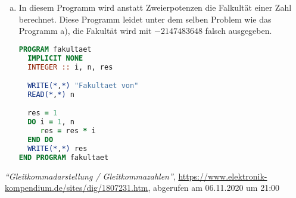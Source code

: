 \documentclass{article}
\begin{document}
\begin{enumerate}[a)]
\begin{lstlisting}[language=Fortran, showstringspaces=false]
  WRITE(*,*) "Anzahl Potenzen"
  READ(*,*) imax

  pot = 1
  DO i = 1, imax
     IF (i > 62) THEN
        WRITE(*,*) "Groessere Potenzen koennen &
             &mit dem Datentyp nicht mehr abgebildet werden"
        EXIT
     END IF
     pot = pot * 2
     WRITE(*,*) pot
  END DO
END PROGRAM Potenz_d
  \end{lstlisting}

\pagebreak
\item
  In diesem Programm wird anstatt Zweierpotenzen die Falkultät einer Zahl berechnet.
  Diese Programm leidet unter dem selben Problem wie das Programm a), die Fakultät wird
  mit $-2147483648$ falsch ausgegeben.
  \begin{lstlisting}[language=Fortran, showstringspaces=false]
PROGRAM fakultaet
  IMPLICIT NONE
  INTEGER :: i, n, res

  WRITE(*,*) "Fakultaet von"
  READ(*,*) n

  res = 1
  DO i = 1, n
     res = res * i
  END DO
  WRITE(*,*) res
END PROGRAM fakultaet
\end{lstlisting}
\end{enumerate}

\begin{thebibliography}{9}

  \emph{``Gleitkommadarstellung / Gleitkommazahlen''},
  \href{https://www.elektronik-kompendium.de/sites/dig/1807231.htm}{https://www.elektronik-kompendium.de/sites/dig/1807231.htm},
  abgerufen am 06.11.2020 um 21:00
\end{thebibliography}
\end{document}
